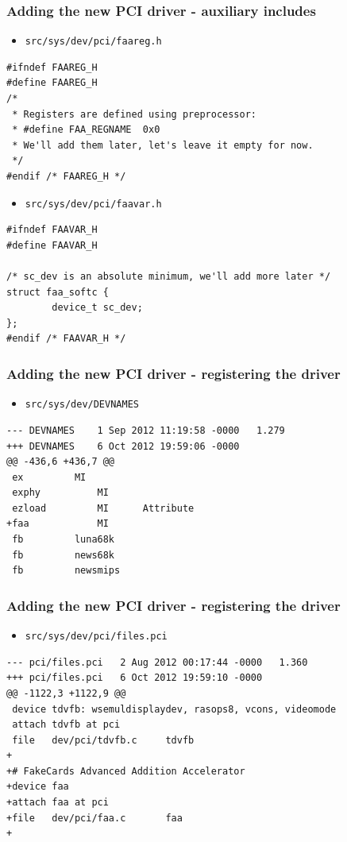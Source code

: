 \documentclass[dvipsnames,table]{beamer}
\begin{document}
\begin{frame}[fragile]
\frametitle{Adding the new PCI driver - auxiliary includes}
\scriptsize
\begin{itemize}
	\item {\tt src/sys/dev/pci/faareg.h}
\end{itemize}
\begin{lstlisting}
#ifndef FAAREG_H
#define FAAREG_H
/* 
 * Registers are defined using preprocessor:
 * #define FAA_REGNAME	0x0
 * We'll add them later, let's leave it empty for now.
 */
#endif /* FAAREG_H */
\end{lstlisting}
\begin{itemize}
	\item {\tt src/sys/dev/pci/faavar.h}
\end{itemize}
\begin{lstlisting}
#ifndef FAAVAR_H
#define FAAVAR_H

/* sc_dev is an absolute minimum, we'll add more later */
struct faa_softc {
        device_t sc_dev;
};
#endif /* FAAVAR_H */
\end{lstlisting}
\end{frame}

\begin{frame}[fragile]
\frametitle{Adding the new PCI driver - registering the driver}
\scriptsize
\begin{itemize}
	\item {\tt src/sys/dev/DEVNAMES}
\end{itemize}
\begin{verbatim}
--- DEVNAMES	1 Sep 2012 11:19:58 -0000	1.279
+++ DEVNAMES	6 Oct 2012 19:59:06 -0000
@@ -436,6 +436,7 @@
 ex			MI
 exphy			MI
 ezload			MI		Attribute
+faa			MI
 fb			luna68k
 fb			news68k
 fb			newsmips
\end{verbatim}
\end{frame}

\begin{frame}[fragile]
\frametitle{Adding the new PCI driver - registering the driver}
\scriptsize
\begin{itemize}
	\item {\tt src/sys/dev/pci/files.pci}
\end{itemize}
\begin{verbatim}
--- pci/files.pci	2 Aug 2012 00:17:44 -0000	1.360
+++ pci/files.pci	6 Oct 2012 19:59:10 -0000
@@ -1122,3 +1122,9 @@
 device	tdvfb: wsemuldisplaydev, rasops8, vcons, videomode
 attach	tdvfb at pci
 file	dev/pci/tdvfb.c		tdvfb	
+
+# FakeCards Advanced Addition Accelerator
+device	faa
+attach	faa at pci
+file	dev/pci/faa.c		faa	
+
\end{verbatim}
\end{frame}
\end{document}
